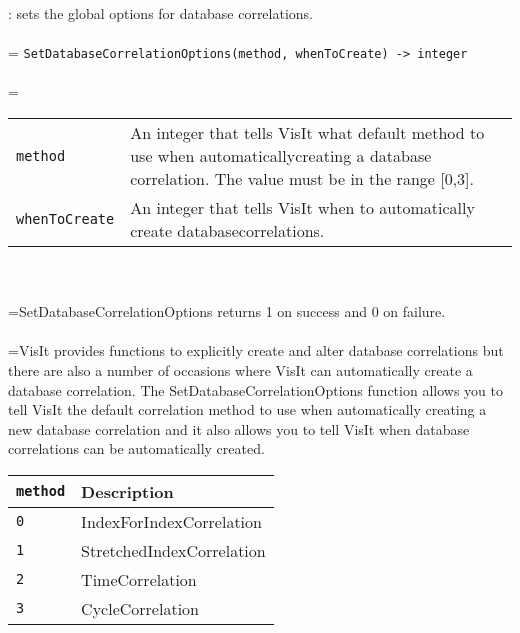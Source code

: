 \documentclass[10pt,a4paper]{report}
\begin{document}
{}
: sets the global options for database correlations.\\[-3mm]

 \\ 
\hangindent=\parindent 
\verb!SetDatabaseCorrelationOptions(method, whenToCreate) -> integer!\\ [-3mm]

 \\ 
\hangindent=\parindent 
\begin{tabular}{lp{9cm}}
\verb!method! & An integer that tells VisIt what default method to use when automaticallycreating a database correlation. The value must be in the range [0,3]. \\
\verb!whenToCreate! & An integer that tells VisIt when to automatically create databasecorrelations. \\
\end{tabular} \\[-2mm]


 \\ 
\hangindent=\parindent SetDatabaseCorrelationOptions returns 1 on success and 0 on failure. \\[-3mm] 

 \\ 
\hangindent=\parindent VisIt provides functions to explicitly create and alter database correlations but there are also a number of occasions where VisIt can automatically create a database correlation. The SetDatabaseCorrelationOptions function allows you to tell VisIt the default correlation method to use when automatically creating a new database correlation and it also allows you to tell VisIt when database correlations can be automatically created. \\

\begin{tabular}{|l|l|}
\hline
\verb!method! & Description \\
\hline \hline
\verb!0! & IndexForIndexCorrelation \\
\verb!1! & StretchedIndexCorrelation \\
\verb!2! & TimeCorrelation \\
\verb!3! & CycleCorrelation \\
\hline
\end{tabular} \\[-2mm]
\\
\end{document}
